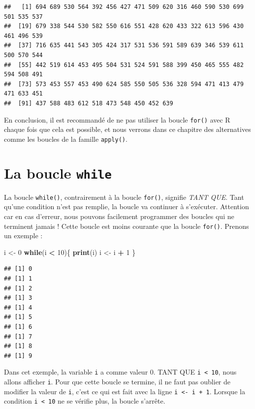\documentclass[
]{book}
\newenvironment{Shaded}{\begin{snugshade}}{\end{snugshade}}
\newcommand{\ControlFlowTok}[1]{\textcolor[rgb]{0.13,0.29,0.53}{\textbf{#1}}}
\newcommand{\DecValTok}[1]{\textcolor[rgb]{0.00,0.00,0.81}{#1}}
\newcommand{\KeywordTok}[1]{\textcolor[rgb]{0.13,0.29,0.53}{\textbf{#1}}}
\newcommand{\NormalTok}[1]{#1}
\newcommand{\OperatorTok}[1]{\textcolor[rgb]{0.81,0.36,0.00}{\textbf{#1}}}
\newcommand{\StringTok}[1]{\textcolor[rgb]{0.31,0.60,0.02}{#1}}
\begin{document}
\begin{verbatim}
##   [1] 694 689 530 564 392 456 427 471 509 620 316 460 590 530 699 501 535 537
##  [19] 679 338 544 530 582 550 616 551 428 620 433 322 613 596 430 461 496 539
##  [37] 716 635 441 543 305 424 317 531 536 591 589 639 346 539 611 500 570 544
##  [55] 442 519 614 453 495 504 531 524 591 588 399 450 465 555 482 594 508 491
##  [73] 573 453 557 453 490 624 585 550 505 536 328 594 471 413 479 471 633 451
##  [91] 437 588 483 612 518 473 548 450 452 639
\end{verbatim}

En conclusion, il est recommandé de ne pas utiliser la boucle \texttt{for()} avec R chaque fois que cela est possible, et nous verrons dans ce chapitre des alternatives comme les boucles de la famille \texttt{apply()}.

\hypertarget{l17while}{%
\section{\texorpdfstring{La boucle \texttt{while}}{La boucle while}}\label{l17while}}

La boucle \texttt{while()}, contrairement à la boucle \texttt{for()}, signifie \emph{TANT QUE}. Tant qu'une condition n'est pas remplie, la boucle va continuer à s'exécuter. Attention car en cas d'erreur, nous pouvons facilement programmer des boucles qui ne terminent jamais ! Cette boucle est moins courante que la boucle \texttt{for()}. Prenons un exemple :

\begin{Shaded}
\begin{Highlighting}[]
\NormalTok{i <-}\StringTok{ }\DecValTok{0}
\ControlFlowTok{while}\NormalTok{(i }\OperatorTok{<}\StringTok{ }\DecValTok{10}\NormalTok{)\{}
  \KeywordTok{print}\NormalTok{(i)}
\NormalTok{  i <-}\StringTok{ }\NormalTok{i }\OperatorTok{+}\StringTok{ }\DecValTok{1}
\NormalTok{\}}
\end{Highlighting}
\end{Shaded}

\begin{verbatim}
## [1] 0
## [1] 1
## [1] 2
## [1] 3
## [1] 4
## [1] 5
## [1] 6
## [1] 7
## [1] 8
## [1] 9
\end{verbatim}

Dans cet exemple, la variable \texttt{i} a comme valeur 0. TANT QUE \texttt{i\ \textless{}\ 10}, nous allons afficher \texttt{i}. Pour que cette boucle se termine, il ne faut pas oublier de modifier la valeur de \texttt{i}, c'est ce qui est fait avec la ligne \texttt{i\ \textless{}-\ i\ +\ 1}. Lorsque la condition \texttt{i\ \textless{}\ 10} ne se vérifie plus, la boucle s'arrête.
\end{document}
